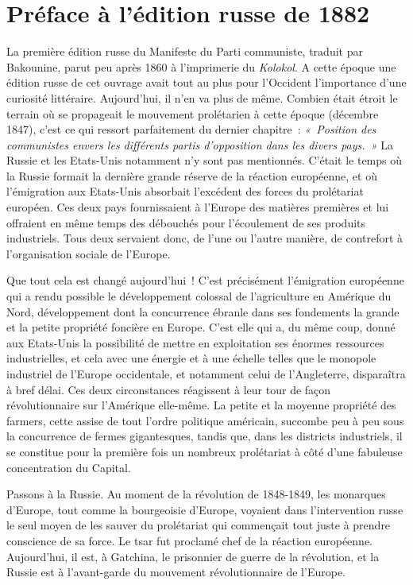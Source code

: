 \documentclass[french,twoside]{book} %
\begin{document}
\section[Préface à l’édition russe de 1882]{Préface à l’édition russe de 1882}
\noindent La première édition russe du Manifeste du Parti communiste, traduit par Bakounine, parut peu après 1860 à l’imprimerie du \emph{Kolokol}. A cette époque une édition russe de cet ouvrage avait tout au plus pour l’Occident l’importance d’une curiosité littéraire. Aujourd’hui, il n’en va plus de même. Combien était étroit le terrain où se propageait le mouvement prolétarien à cette époque (décembre 1847), c’est ce qui ressort parfaitement du dernier chapitre : \emph{« Position des communistes envers les différents partis d’opposition dans les divers pays. »} La Russie et les Etats-Unis notamment n’y sont pas mentionnés. C'était le temps où la Russie formait la dernière grande réserve de la réaction européenne, et où l’émigration aux Etats-Unis absorbait l’excédent des forces du prolétariat européen. Ces deux pays fournissaient à l’Europe des matières premières et lui offraient en même temps des débouchés pour l’écoulement de ses produits industriels. Tous deux servaient donc, de l’une ou l’autre manière, de contrefort à l’organisation sociale de l’Europe.\par
Que tout cela est changé aujourd’hui ! C'est précisément l’émigration européenne qui a rendu possible le développement colossal de l’agriculture en Amérique du Nord, développement dont la concurrence ébranle dans ses fondements la grande et la petite propriété foncière en Europe. C'est elle qui a, du même coup, donné aux Etats-Unis la possibilité de mettre en exploitation ses énormes ressources industrielles, et cela avec une énergie et à une échelle telles que le monopole industriel de l’Europe occidentale, et notamment celui de l’Angleterre, disparaîtra à bref délai. Ces deux circonstances réagissent à leur tour de façon révolutionnaire sur l’Amérique elle-même. La petite et la moyenne propriété des farmers, cette assise de tout l’ordre politique américain, succombe peu à peu sous la concurrence de fermes gigantesques, tandis que, dans les districts industriels, il se constitue pour la première fois un nombreux prolétariat à côté d’une fabuleuse concentration du Capital.\par
Passons à la Russie. Au moment de la révolution de 1848-1849, les monarques d’Europe, tout comme la bourgeoisie d’Europe, voyaient dans l’intervention russe le seul moyen de les sauver du prolétariat qui commençait tout juste à prendre conscience de sa force. Le tsar fut proclamé chef de la réaction européenne. Aujourd’hui, il est, à Gatchina, le prisonnier de guerre de la révolution, et la Russie est à l’avant-garde du mouvement révolutionnaire de l’Europe.\par
\end{document}
